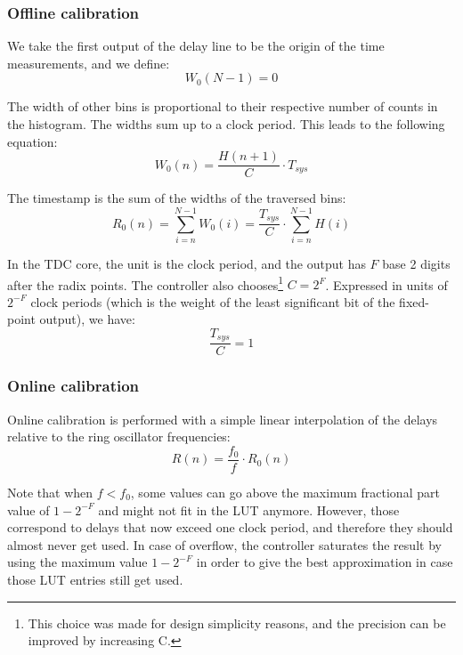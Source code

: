 \documentclass[a4paper,11pt]{article}
\begin{document}
\subsubsection{Offline calibration}
We take the first output of the delay line to be the origin of the time measurements, and we define:
\begin{equation}
W_{0}(N-1) = 0
\end{equation}

The width of other bins is proportional to their respective number of counts in the histogram. The widths sum up to a clock period. This leads to the following equation:
\begin{equation}
W_{0}(n) = \frac{H(n+1)}{C} \cdot T_{sys}
\end{equation}

The timestamp is the sum of the widths of the traversed bins:
\begin{equation}
R_{0}(n) = \displaystyle\sum\limits_{i=n}^{N-1}{W_{0}(i)} = \frac{T_{sys}}{C} \cdot \displaystyle\sum\limits_{i=n}^{N-1}{H(i)}
\end{equation}

In the TDC core, the unit is the clock period, and the output has $F$ base 2 digits after the radix points. The controller also chooses\footnote{This choice was made for design simplicity reasons, and the precision can be improved by increasing C.} $C=2^F$. Expressed in units of $2^{-F}$ clock periods (which is the weight of the least significant bit of the fixed-point output), we have:
\begin{equation}
\frac{T_{sys}}{C}=1
\end{equation}

\subsubsection{Online calibration}
Online calibration is performed with a simple linear interpolation of the delays relative to the ring oscillator frequencies:
\begin{equation}
R(n) = \frac{f_{0}}{f} \cdot R_{0}(n)
\end{equation}

Note that when $f < f_{0}$, some values can go above the maximum fractional part value of $1 - 2^{-F}$ and might not fit in the LUT anymore. However, those correspond to delays that now exceed one clock period, and therefore they should almost never get used. In case of overflow, the controller saturates the result by using the maximum value $1 - 2^{-F}$ in order to give the best approximation in case those LUT entries still get used.
\end{document}
